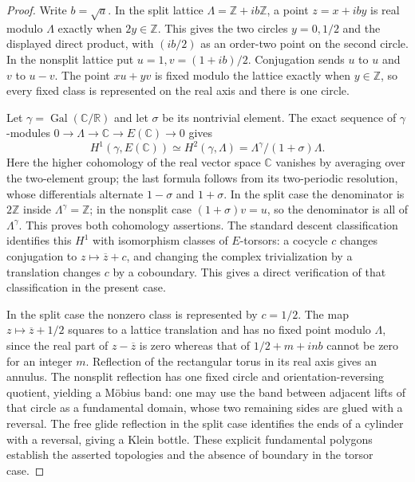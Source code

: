 \begin{proof}
Write $b=\sqrt a$. In the split lattice
$\Lambda=\mathbb Z+ib\mathbb Z$, a point $z=x+iby$ is real
modulo $\Lambda$ exactly when $2y\in\mathbb Z$. This gives the
two circles $y=0,1/2$ and the displayed direct product, with
$(ib/2)$ as an order-two point on the second circle. In the
nonsplit lattice put $u=1,v=(1+ib)/2$. Conjugation sends
$u$ to $u$ and $v$ to $u-v$. The point $xu+yv$ is fixed modulo
the lattice exactly when $y\in\mathbb Z$, so every fixed class
is represented on the real axis and there is one circle.

Let $\gamma=\operatorname{Gal}(\mathbb C/\mathbb R)$ and let
$\sigma$ be its nontrivial element. The exact sequence of
$\gamma$-modules
$0\to\Lambda\to\mathbb C\to E(\mathbb C)\to0$ gives
\[
 H^1(\gamma,E(\mathbb C))\simeq H^2(\gamma,\Lambda)
 =\Lambda^\gamma/(1+\sigma)\Lambda.
\]
Here the higher cohomology of the real vector space $\mathbb C$
vanishes by averaging over the two-element group; the last
formula follows from its two-periodic resolution, whose
differentials alternate $1-\sigma$ and $1+\sigma$. In the
split case the denominator is $2\mathbb Z$ inside
$\Lambda^\gamma=\mathbb Z$; in the nonsplit case
$(1+\sigma)v=u$, so the denominator is all of
$\Lambda^\gamma$. This proves both cohomology assertions.
The standard descent classification identifies this $H^1$ with
isomorphism classes of $E$-torsors: a cocycle $c$ changes
conjugation to $z\mapsto\overline z+c$, and changing the
complex trivialization by a translation changes $c$ by a
coboundary. This gives a direct verification of that
classification in the present case.

In the split case the nonzero class is represented by $c=1/2$.
The map $z\mapsto\overline z+1/2$ squares to a lattice
translation and has no fixed point modulo $\Lambda$, since
the real part of $z-\overline z$ is zero whereas that of
$1/2+m+inb$ cannot be zero for an integer $m$.
Reflection of the rectangular torus in its real axis gives an
annulus. The nonsplit reflection has one fixed circle and
orientation-reversing quotient, yielding a M\"obius band:
one may use the band between adjacent lifts of that circle as
a fundamental domain, whose two remaining sides are glued
with a reversal. The free glide reflection in the split case
identifies the ends of a cylinder with a reversal, giving a
Klein bottle. These explicit fundamental polygons establish
the asserted topologies and the absence of boundary in the
torsor case.
\end{proof}
